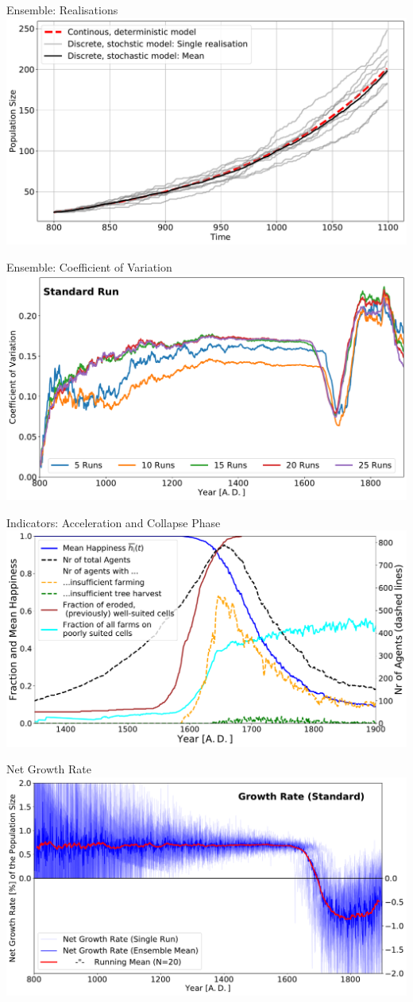 \begin{frame}{Ensemble: Realisations}
	\centering
	\includegraphics[width=0.7\linewidth]{../../Thesis/images/RealisationsOfPopGrowth}
\end{frame}

\begin{frame}{Ensemble: Coefficient of Variation}
	\centering
	\includegraphics[width=0.7\linewidth]{../../Thesis/images/Results/Standard/CoeffOfVariation}
\end{frame}

\begin{frame}{Indicators: Acceleration and Collapse Phase}
\centering
\includegraphics[width=0.7\linewidth]{../../Thesis/images/Results/Standard/StandardsecondaryStats}
\end{frame}



\begin{frame}{Net Growth Rate}
	\centering
	\includegraphics[width=0.7\linewidth]{../../Thesis/images/Results/Standard/NetGrowthRate}
\end{frame}


